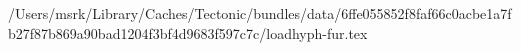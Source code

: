 /Users/msrk/Library/Caches/Tectonic/bundles/data/6ffe055852f8faf66c0acbe1a7fb27f87b869a90bad1204f3bf4d9683f597c7c/loadhyph-fur.tex